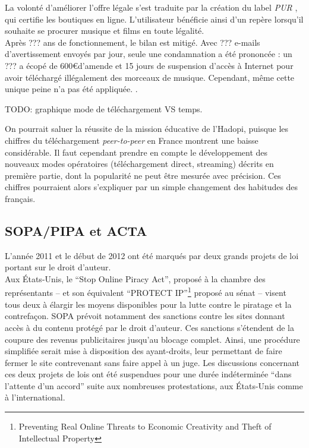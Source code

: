 \documentclass[a4paper]{report}
\begin{document}
		La volonté d'améliorer l'offre légale s'est traduite par la création du label \emph{PUR} \cite{label-pur}, qui certifie les boutiques en ligne. L'utilisateur bénéficie ainsi d'un repère lorsqu'il souhaite se procurer musique et films en toute légalité.\\

		\label{hadopi-echec}
		Après ??? ans de fonctionnement, le bilan est mitigé. Avec ??? e-mails d'avertissement envoyés par jour, seule une condamnation a été prononcée : un ??? a écopé de 600\euro d'amende et 15 jours de suspension d'accès à Internet pour avoir téléchargé illégalement des morceaux de musique. Cependant, même cette unique peine n'a pas été appliquée. \cite{hadopi-condamnation}.

		TODO: graphique mode de téléchargement VS temps.

		On pourrait saluer la réussite de la mission éducative de l'Hadopi, puisque les chiffres du téléchargement \emph{peer-to-peer} en France montrent une baisse considérable. Il faut cependant prendre en compte le développement des nouveaux modes opératoires (téléchargement direct, streaming) décrits en première partie, dont la popularité ne peut être mesurée avec précision. Ces chiffres pourraient alors s'expliquer par un simple changement des habitudes des français.

		\subsection{SOPA/PIPA et ACTA}
		L'année 2011 et le début de 2012 ont été marqués par deux grands projets de loi portant sur le droit d'auteur.\\

		Aux États-Unis, le ``Stop Online Piracy Act'', proposé à la chambre des représentants – et son équivalent ``PROTECT IP''\footnote{Preventing Real Online Threats to Economic Creativity and Theft of Intellectual Property} proposé au sénat – visent tous deux à élargir les moyens disponibles pour la lutte contre le piratage et la contrefaçon. SOPA prévoit notamment des sanctions contre les sites donnant accès à du contenu protégé par le droit d'auteur. Ces sanctions s'étendent de la coupure des revenus publicitaires jusqu'au blocage complet. Ainsi, une procédure simplifiée serait mise à disposition des ayant-droits, leur permettant de faire fermer le site contrevenant sans faire appel à un juge. Les discussions concernant ces deux projets de lois ont été suspendues pour une durée indéterminée ``dans l'attente d'un accord'' \cite{suspension-sopa} suite aux nombreuses protestations, aux États-Unis comme à l'international.\\
\end{document}
